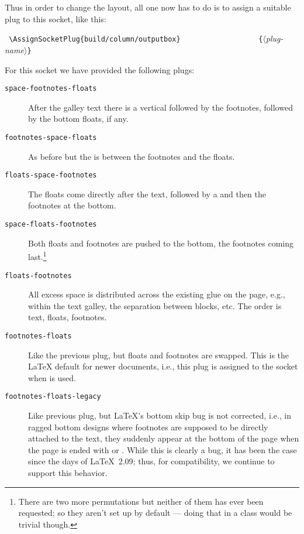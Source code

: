 \documentclass{ltnews}
\providecommand\plug[1]{\texttt{#1}}
\providecommand\meta[1]{$\langle$\textrm{\itshape#1}$\rangle$}
\begin{document}
Thus in order to change the layout, all one now 
has to do is to assign a suitable
plug to this socket, like this:
\begin{flushleft}
  \verb= \AssignSocketPlug{build/column/outputbox}=
  \verb=                  {=\meta{plug-name}\verb=}=
\end{flushleft}
%
For this socket we have provided the following plugs:
\begin{description}
\item[\plug{space-footnotes-floats}]

   After the galley text there is a vertical 
   followed by the footnotes, followed by the bottom floats, if any.

\item[\plug{footnotes-space-floats}]

   As before but the  is between the footnotes and the floats.

\item[\plug{floats-space-footnotes}]

   The floats come directly after the text, followed by a  and then the footnotes
   at the bottom.

\item[\plug{space-floats-footnotes}]

   Both floats and footnotes are pushed to the bottom, the footnotes
   coming last.\footnote{There are two more permutations but neither
   of them has ever been requested; so they aren't set up by default
   --- doing that in a class would be trivial though.}

\item[\plug{floats-footnotes}]

   All excess space is distributed across the existing
   glue on the page, e.g., within the text galley, the
   separation between blocks, etc.
   The order is text, floats, footnotes.

\item[\plug{footnotes-floats}]

   Like the previous plug, but floats and footnotes are swapped. This is
   the \LaTeX{} default for newer documents, i.e., this plug is
   assigned to the socket when  is used.

\item[\plug{footnotes-floats-legacy}]

   Like previous plug, but \LaTeX{}'s bottom skip bug is not
   corrected, i.e., in ragged bottom designs where footnotes
   are supposed to be directly attached to the text, they suddenly
   appear at the bottom of the page when the page is ended with
    or .
   While this is clearly a bug, it has been the case since the days
   of \LaTeX~2.09; thus, for
   compatibility, we continue to support this behavior.
\end{description}
\end{document}

